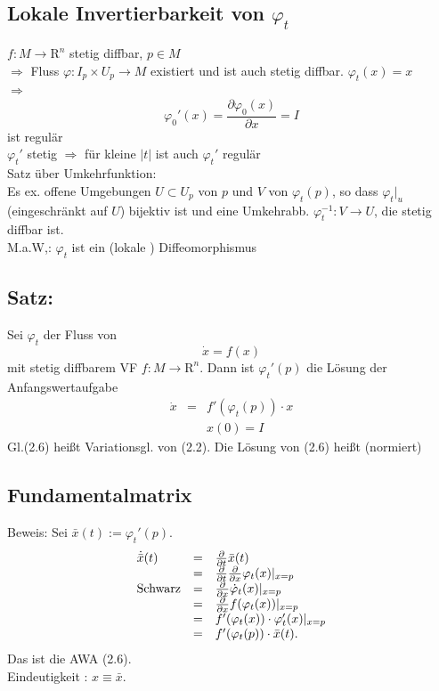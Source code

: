 \documentclass[ngerman]{tudscrreprt}
\begin{document}
\subsection*{Lokale Invertierbarkeit von $\varphi_t$}
$f: M\to \mathrm{R}^n$ stetig diffbar, $p\in M$\\ $\Rightarrow$ Fluss $\varphi: I_p \times U_p \to M$
existiert und ist auch stetig diffbar.
$\varphi_t(x) = x$ \\ 
$\Rightarrow$\begin{equation*}
\varphi_0' (x) = \frac{\partial \varphi_0(x)}{\partial x} = I 
\end{equation*}ist regulär 
\\$\varphi_t'$ stetig $\Rightarrow$ für kleine $|t|$ ist auch $\varphi_t'$ regulär\\ 
Satz über Umkehrfunktion:\\ 
Es ex. offene Umgebungen $U \subset U_p$ von $p$ und $V$ von $\varphi_t(p)$, so dass $\varphi_t|_u$ (eingeschränkt auf $U$) 
bijektiv ist und eine Umkehrabb. $\varphi_t^{-1}: V\to U$, die stetig diffbar ist. \\ 
M.a.W,: $\varphi_t$ ist ein (lokale ) Diffeomorphismus
\subsection*{Satz:} Sei $\varphi_t$ der Fluss von \begin{equation*} \dot x = f(x) \tag{2.2} \end{equation*} mit stetig diffbarem VF $f: M \to \mathrm{R}^n$. Dann ist $\varphi_t'(p)$ die Lösung der Anfangswertaufgabe \begin{equation*} \begin{matrix} \dot x &=& f'(\varphi_t(p))\cdot x \\ &&x(0)=I \end{matrix} \tag{2.6} \end{equation*} Gl.(2.6) heißt Variationsgl. von (2.2). Die Lösung von (2.6) heißt (normiert)
\subsection*{Fundamentalmatrix}Beweis: Sei $\bar x(t) := \varphi_t'(p)$. 
\begin{equation*}
\begin{array}{ l l l}
\dot{\bar{x}}(t) &=& \frac{\partial }{\partial t} \bar{x}(t)\\ 
&=&\frac{\partial }{\partial t} \frac{\partial }{\partial x} \varphi_t(x)|_{x=p}\\
\text{Schwarz} &=& \frac{\partial}{\partial x} \dot{\varphi}_t (x)|_{x= p}\\ 
&=& \frac{\partial }{\partial x} f (\varphi_t (x))|_{x=p}\\ 
&=&f'(\varphi_t (x))\cdot \varphi_t'(x)|_{x=p} \\ 
&=&f'(\varphi_t(p))\cdot \bar{x}(t).
\end{array}
\end{equation*}
Das ist die AWA (2.6). \\ 
Eindeutigkeit : $x \equiv \bar{x}$. 
\end{document}
